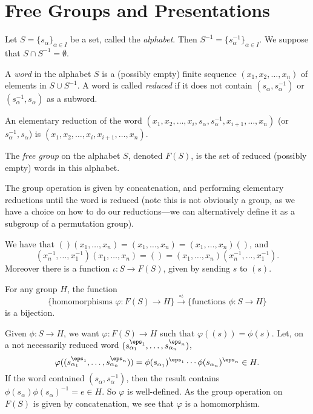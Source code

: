 \documentclass[12pt]{article}
\begin{document}
\newpage

\section{Free Groups and Presentations}
\label{sec:fg_pres}

Let $S = \{s_\alpha\}_{\alpha \in I}$ be a set, called the \emph{alphabet}. Then $S^{-1} = \{s_\alpha^{-1}\}_{\alpha \in I}$. We suppose that $S \cap S^{-1} = \emptyset$.

A \emph{word} in the alphabet $S$ is a (possibly empty) finite sequence $(x_1, x_2, \ldots, x_n)$ of elements in $S \cup S^{-1}$. A word is called \emph{reduced} if it does not contain $(s_\alpha, s_\alpha^{-1})$ or $(s_\alpha^{-1}, s_\alpha)$ as a subword.

An elementary reduction of the word $(x_1, x_2, \ldots, x_i, s_\alpha, s_\alpha^{-1}, x_{i+1}, \ldots, x_n)$ (or $s_\alpha^{-1}, s_\alpha$) is $(x_1, x_2, \ldots, x_i, x_{i+1}, \ldots, x_n)$.

\begin{definition}
	The \emph{free group} on the alphabet $S$, denoted $F(S)$, is the set of reduced (possibly empty) words in this alphabet.

	The group operation is given by concatenation, and performing elementary reductions until the word is reduced (note this is not obviously a group, as we have a choice on how to do our reductions---we can alternatively define it as a subgroup of a permutation group).

	We have that $()(x_1, \ldots, x_n) = (x_1, \ldots, x_n) = (x_1, \ldots, x_n)()$, and
	\[
		(x_n^{-1}, \ldots, x_1^{-1})(x_1, \ldots, x_n) = () = (x_1, \ldots, x_n)(x_n^{-1}, \ldots, x_1^{-1}).
	\]
	Moreover there is a function $\iota : S \to F(S)$, given by sending $s$ to $(s)$.
\end{definition}

\begin{lemma}
	For any group $H$, the function
	\[
		\{\text{homomorphisms } \varphi : F(S) \to H\} \overset{\circ \iota}{\to} \{\text{functions } \phi : S \to H\}
	\]
	is a bijection.
\end{lemma}

\begin{proofbox}
	Given $\phi : S \to H$, we want $\varphi : F(S) \to H$ such that $\varphi((s)) = \phi(s)$. Let, on a not necessarily reduced word $(s_{\alpha_1}^{\eps_1}, \ldots, s_{\alpha_n}^{\eps_n})$,
	\[
	\varphi((s_{\alpha_1}^{\eps_1}, \ldots, s_{\alpha_n}^{\eps_n})) = \phi(s_{\alpha_1})^{\eps_1} \cdots \phi(s_{\alpha_n})^{\eps_n} \in H.
	\]
	If the word contained $(s_\alpha, s_\alpha^{-1})$, then the result contains $\phi(s_\alpha) \phi(s_\alpha)^{-1} = e \in H$. So $\varphi$ is well-defined. As the group operation on $F(S)$ is given by concatenation, we see that $\varphi$ is a homomorphism.
\end{proofbox}
\end{document}
